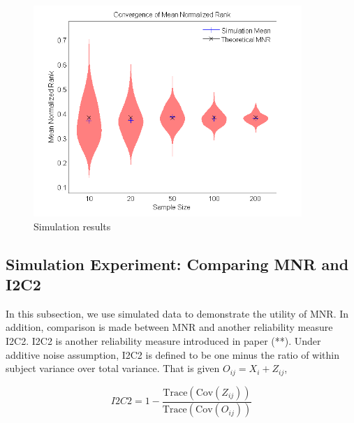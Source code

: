 \documentclass{article}
\begin{document}
\begin{figure}[t!]
\begin{center}
\includegraphics[width=4in]{simumnr_violin}
\end{center}
\caption{Simulation results}
\end{figure}

\subsection{Simulation Experiment: Comparing MNR and I2C2}
\noindent In this subsection, we use simulated data to demonstrate the utility of MNR. In addition, comparison is made between MNR and another reliability measure I2C2. I2C2 is another reliability measure introduced in paper (**). Under additive noise assumption, I2C2 is defined to be one minus the ratio of within subject variance over total variance. That is given $O_{ij}=X_i+Z_{ij}$,
 
\[ I2C2=1-\frac{\text{Trace}(\text{Cov}(Z_{ij}))}{\text{Trace}(\text{Cov}(O_{ij}))} \]
\end{document}
